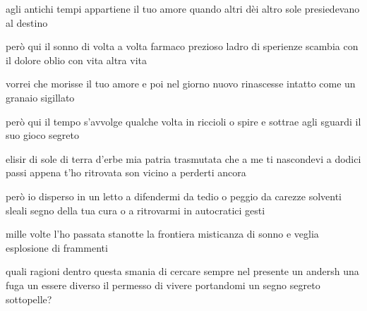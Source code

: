 \begin{poem}
	\begin{stanza}
                agli antichi tempi\verseline
                appartiene il tuo amore\verseline
                quando altri dèi altro sole\verseline
                presiedevano al destino
	\end{stanza}

	\begin{stanza}
                però qui il sonno\verseline
                di volta a volta\verseline
                farmaco prezioso\verseline
                ladro di sperienze\verseline
                scambia con il dolore oblio\verseline
                con vita altra vita
	\end{stanza}

	\begin{stanza}
                vorrei che morisse il tuo amore\verseline
                e poi nel giorno nuovo\verseline
                rinascesse intatto\verseline
                come un granaio sigillato
	\end{stanza}

	\begin{stanza}
                però qui il tempo\verseline
                s’avvolge qualche volta\verseline
                in riccioli o spire\verseline
                e sottrae agli sguardi\verseline
                il suo gioco segreto
	\end{stanza}

	\begin{stanza}
                elisir di sole di terra d’erbe\verseline
                mia patria trasmutata\verseline
                che a me ti nascondevi\verseline
                a dodici passi appena\verseline
                t’ho ritrovata\verseline
                son vicino a perderti ancora
	\end{stanza}

	\begin{stanza}
                però io disperso\verseline
                in un letto a difendermi da tedio\verseline
                o peggio da carezze\verseline
                solventi sleali\verseline
                segno della tua cura\verseline
                o a ritrovarmi in autocratici gesti
	\end{stanza}

	\begin{stanza}
                mille volte l’ho passata\verseline
                stanotte la frontiera\verseline
                misticanza di sonno e veglia\verseline
                esplosione di frammenti
	\end{stanza}

	\begin{stanza}
                quali ragioni dentro questa smania\verseline
                di cercare sempre nel presente\verseline
                un andersh una fuga\verseline
                un essere diverso\verseline
                il permesso di vivere portandomi\verseline
                un segno segreto sottopelle?
	\end{stanza}
\end{poem}

